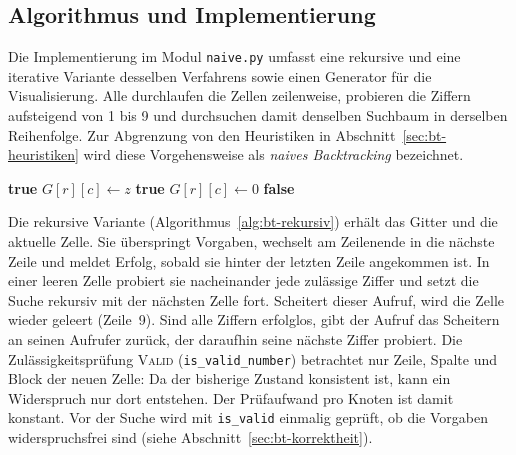 \subsection{Algorithmus und Implementierung}\label{sec:bt-algorithmus}

Die Implementierung im Modul \texttt{naive.py} umfasst eine rekursive und eine iterative Variante 
desselben Verfahrens sowie einen Generator für die Visualisierung. 
Alle durchlaufen die Zellen zeilenweise, probieren die Ziffern aufsteigend von 1 bis 9 
und durchsuchen damit denselben Suchbaum in derselben Reihenfolge. 
Zur Abgrenzung von den Heuristiken in Abschnitt~\ref{sec:bt-heuristiken} 
wird diese Vorgehensweise als \emph{naives Backtracking} bezeichnet.

\begin{algorithm}[hbt]
	\caption{Rekursives Backtracking (\texttt{solve})}\label{alg:bt-rekursiv}
	\begin{algorithmic}[1]
		 
			 \Return \textbf{true} 
			\EndIf
			 \Return {} 
			\EndIf
			 \Return {} 
			\EndIf
					\State $G[r][c] \gets z$
					 \Return \textbf{true}
					\EndIf
					\State $G[r][c] \gets 0$ 
				\EndIf
			\EndFor
			\State \Return \textbf{false}
		\EndFunction
	\end{algorithmic}
\end{algorithm}

Die rekursive Variante (Algorithmus~\ref{alg:bt-rekursiv}) erhält das Gitter und die aktuelle Zelle. 
Sie überspringt Vorgaben, wechselt am Zeilenende in die nächste Zeile und meldet Erfolg, 
sobald sie hinter der letzten Zeile angekommen ist. 
In einer leeren Zelle probiert sie nacheinander jede zulässige Ziffer und setzt die Suche rekursiv mit der nächsten Zelle fort. 
Scheitert dieser Aufruf, wird die Zelle wieder geleert (Zeile~9). 
Sind alle Ziffern erfolglos, gibt der Aufruf das Scheitern an seinen Aufrufer zurück, 
der daraufhin seine nächste Ziffer probiert. 
Die Zulässigkeitsprüfung \textsc{Valid} (\texttt{is\_valid\_number}) betrachtet nur Zeile, Spalte und Block der neuen Zelle: 
Da der bisherige Zustand konsistent ist, kann ein Widerspruch nur dort entstehen. 
Der Prüfaufwand pro Knoten ist damit konstant. 
Vor der Suche wird mit \texttt{is\_valid} einmalig geprüft, ob die Vorgaben widerspruchsfrei sind 
(siehe Abschnitt~\ref{sec:bt-korrektheit}).

